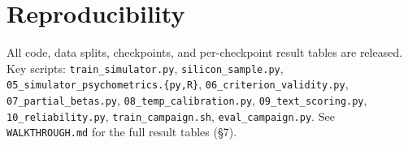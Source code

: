 \documentclass[11pt]{article}
\begin{document}
\section{Reproducibility}

All code, data splits, checkpoints, and per-checkpoint result tables are released. Key scripts: \texttt{train\_simulator.py}, \texttt{silicon\_sample.py}, \texttt{05\_simulator\_psychometrics.\{py,R\}}, \texttt{06\_criterion\_validity.py}, \texttt{07\_partial\_betas.py}, \texttt{08\_temp\_calibration.py}, \texttt{09\_text\_scoring.py}, \texttt{10\_reliability.py}, \texttt{train\_campaign.sh}, \texttt{eval\_campaign.py}. See \texttt{WALKTHROUGH.md} for the full result tables (\S{}7).

\end{document}
